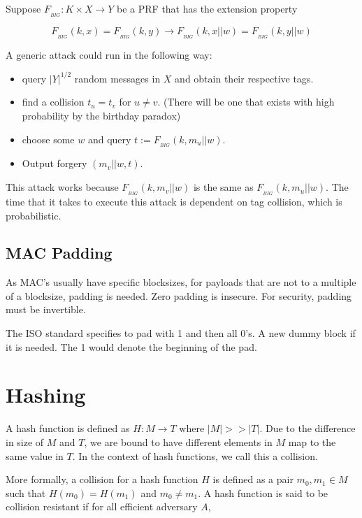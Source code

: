 \documentclass{article}
\begin{document}
\begin{multicols}{2}
Suppose $F_{_{BIG}}: K \times X \rightarrow Y$ be a PRF that has the extension property

$$
F_{_{BIG}}(k,x) = F_{_{BIG}}(k,y) \rightarrow F_{_{BIG}}(k,x||w) = F_{_{BIG}}(k,y||w)
$$

A generic attack could run in the following way:

\begin{itemize}
    \item query $|Y|^{1/2}$ random messages in $X$ and obtain their respective tags.
    \item find a collision $t_u = t_v$ for $u \neq v$. (There will be one that exists with high probability by the birthday paradox)
    \item choose some $w$ and query $t := F_{_{BIG}}(k, m_u || w)$.
    \item Output forgery $(m_v||w, t)$.
\end{itemize}

This attack works because $F_{_{BIG}}(k, m_v || w)$ is the same as $F_{_{BIG}}(k, m_u || w)$. The time that it takes to execute this attack is dependent on tag collision, which is probabilistic.

\subsection{MAC Padding}

As MAC's usually have specific blocksizes, for payloads that are not to a multiple of a blocksize, padding is needed. Zero padding is insecure. For security, padding must be invertible.

The ISO standard specifies to pad with 1 and then all 0's. A new dummy block if it is needed. The 1 would denote the beginning of the pad.

\section{Hashing}

A hash function is defined as $H: M \rightarrow T$ where $|M| >> |T|$. Due to the difference in size of $M$ and $T$, we are bound to have different elements in $M$ map to the same value in $T$. In the context of hash functions, we call this a collision. 

More formally, a collision for a hash function $H$ is defined as a pair $m_0, m_1 \in M$ such that $H(m_0) = H(m_1)$ and $m_0 \neq m_1$. A hash function is said to be collision resistant if for all efficient adversary $A$, 


\end{multicols}
\end{document}
